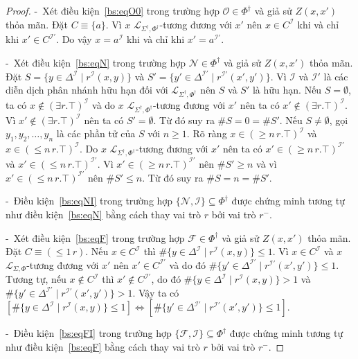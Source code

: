 \documentclass[12pt,a4paper,twoside]{report}
\newcommand{\mL}		{\mathcal{L}}
\newcommand{\mI}		{\mathcal{I}}
\newcommand{\mO}		{\mathcal{O}}
\newcommand{\mN}		{\mathcal{N}}
\newcommand{\mF}		{\mathcal{F}}
\newcommand{\PhiDag}	{\Phi^\dag}
\newcommand{\mLSP}		{\mL_{\Sigma,\Phi}}
\newcommand{\mLSPD}		{\mL_{\Sigma^\dag,\Phi^\dag}}
\newcommand{\semiItem}	{\mbox{- }}
\newcommand{\E}			{\exists}
\renewcommand{\sharp}		{\#}
\theoremstyle{definition}
\begin{document}
\begin{proof}
\semiItem Xét điều kiện~\eqref{bs:eqO0} trong trường hợp $\mO \in \PhiDag$ và giả sử $Z(x,x')$ thỏa mãn. Đặt $C \equiv \{a\}$. Vì $x$ $\mLSPD$-tương đương với $x'$ nên $x \in C^\mI$ khi và chỉ khi $x' \in C^{\mI'}$. Do vậy $x = a^\mI$ khi và chỉ khi $x' = a^{\mI'}$.

\semiItem Xét điều kiện~\eqref{bs:eqN} trong trường hợp $\mN \in \PhiDag$ và giả sử $Z(x,x')$ thỏa mãn. Đặt $S = \{y \in \Delta^\mI \mid r^\mI(x,y)\}$ và $S' = \{y' \in \Delta^{\mI'} \mid r^{\mI'}(x',y')\}$. Vì $\mI$ và $\mI'$ là các diễn dịch phân nhánh hữu hạn đối với $\mLSPD$ nên $S$ và $S'$ là hữu hạn. Nếu $S=\emptyset$, ta có $x \notin (\E r.\top)^\mI$ và do $x$ $\mLSPD$-tương đương với $x'$ nên ta có $x' \notin (\E r.\top)^\mI$. Vì $x' \notin (\E r.\top)^\mI$ nên ta có $S' = \emptyset$. Từ đó suy ra $\sharp S = 0 = \sharp S'$. Nếu $S \not= \emptyset$, gọi $y_1, y_2, \ldots, y_n$ là các phần tử của $S$ với $n \geq 1$. Rõ ràng $x \in (\geq n\,r.\top)^\mI$ và $x \in (\leq n\,r.\top)^\mI$. Do $x$ $\mLSPD$-tương đương với $x'$ nên ta có $x' \in (\geq n\,r.\top)^{\mI'}$ và $x' \in (\leq n\,r.\top)^{\mI'}$. Vì $x' \in (\geq n\,r.\top)^{\mI'}$ nên $\sharp S' \geq n$ và vì $x' \in (\leq n\,r.\top)^{\mI'}$ nên $\sharp S' \leq n$. Từ đó suy ra $\sharp S = n = \sharp S'$.

\semiItem Điều kiện~\eqref{bs:eqNI} trong trường hợp $\{\mN,\mI\} \subseteq \PhiDag$ được chứng minh tương tự như điều kiện~\eqref{bs:eqN} bằng cách thay vai trò $r$ bởi vai trò $r^-$.

\semiItem Xét điều kiện~\eqref{bs:eqF} trong trường hợp $\mF \in \PhiDag$ và giả sử $Z(x,x')$ thỏa mãn. Đặt $C \equiv (\leq 1\,r)$. Nếu $x \in C^\mI$ thì $\sharp\{y \in \Delta^\mI \mid r^\mI(x,y)\} \leq 1$. Vì $x \in C^\mI$ và $x$ $\mLSP$-tương đương với $x'$ nên $x' \in C^{\mI'}$ và do đó $\sharp\{y' \in \Delta^{\mI'} \mid r^{\mI'}(x',y')\} \leq 1$. Tương tự, nếu $x \notin C^\mI$ thì $x' \notin C^{\mI'}$, do đó $\sharp\{y \in \Delta^\mI \mid r^\mI(x,y)\} > 1$ và $\sharp\{y' \in \Delta^{\mI'} \mid r^{\mI'}(x',y')\} > 1$. Vậy ta có $[\sharp\{y \in \Delta^\mI \mid r^\mI(x,y)\} \leq 1] \Leftrightarrow [\sharp\{y' \in \Delta^{\mI'} \mid r^{\mI'}(x',y')\} \leq 1]$.

\semiItem Điều kiện~\eqref{bs:eqFI} trong trường hợp $\{\mF,\mI\} \subseteq \PhiDag$ được chứng minh tương tự như điều kiện~\eqref{bs:eqF} bằng cách thay vai trò $r$ bởi vai trò $r^-$.
 

\end{proof}
\end{document}
